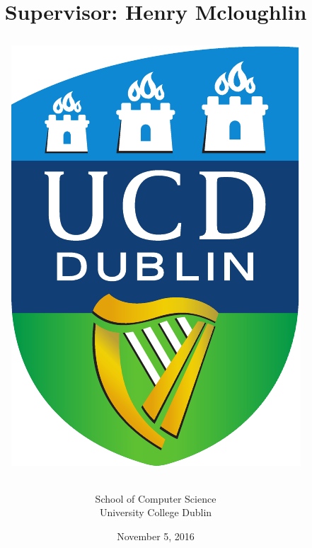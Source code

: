 \documentclass{article}
\title{
\vspace{0.3in}
\textbf{\hmwkTitle}
\vspace{1in}\\
\textmd{\textbf{\hmwkClass}}\\\ \\
\normalsize\
\vspace{0.4in}
\textmd{\textbf{\hmwkAuthorName}}\\
\vspace{0.1in}
\small{\hmwkDesc}\\
\vspace{0.05in}
\small{\textbf{Supervisor}: Henry Mcloughlin}
\vspace{.5in}
\begin{center}
\includegraphics[width=0.3\columnwidth]{UCD_Logo} %
\end{center}
}
\author{School of Computer Science\\University College Dublin}
\date{\small{November 5, 2016}} %
\begin{document}
\begin{titlepage}
\maketitle
\thispagestyle{empty}
\end{titlepage}

\newpage


\newpage
\doublespacing
\tableofcontents
\singlespacing
\newpage

\end{document}
